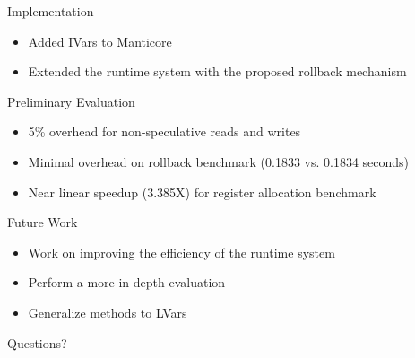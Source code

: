 \documentclass[mathserif]{beamer}
\newcommand{\bis}[1]{\begin{itemize}\setlength{\itemsep}{#1}}
\begin{document}
\begin{frame}{Implementation}
\bis{.5cm}
\item Added IVars to Manticore
\item Extended the runtime system with the proposed rollback mechanism
\end{itemize}
\end{frame}

\begin{frame}{Preliminary Evaluation}
\begin{itemize}
\item 5\% overhead for non-speculative reads and writes
\item Minimal overhead on rollback benchmark (0.1833 vs. 0.1834 seconds)
\item Near linear speedup (3.385X) for register allocation benchmark
\end{itemize}

\end{frame}

\begin{frame}{Future Work}
\bis{.5cm}
\item Work on improving the efficiency of the runtime system
\item Perform a more in depth evaluation
\item Generalize methods to LVars
\end{itemize}
\end{frame}

\begin{frame}
\Huge{\centerline{Questions?}}
\end{frame}
\end{document}

